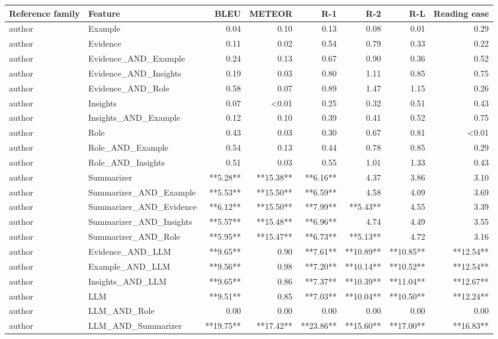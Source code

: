 \begin{tabular}{llrrrrrr}
\toprule
Reference family & Feature & BLEU & METEOR & R-1 & R-2 & R-L & Reading ease \\
\midrule
author & Example & 0.04 & 0.10 & 0.13 & 0.08 & 0.01 & 0.29 \\
author & Evidence & 0.11 & 0.02 & 0.54 & 0.79 & 0.33 & 0.22 \\
author & Evidence_AND_Example & 0.24 & 0.13 & 0.67 & 0.90 & 0.36 & 0.52 \\
author & Evidence_AND_Insights & 0.19 & 0.03 & 0.80 & 1.11 & 0.85 & 0.75 \\
author & Evidence_AND_Role & 0.58 & 0.07 & 0.89 & 1.47 & 1.15 & 0.26 \\
author & Insights & 0.07 & <0.01 & 0.25 & 0.32 & 0.51 & 0.43 \\
author & Insights_AND_Example & 0.12 & 0.10 & 0.39 & 0.41 & 0.52 & 0.75 \\
author & Role & 0.43 & 0.03 & 0.30 & 0.67 & 0.81 & <0.01 \\
author & Role_AND_Example & 0.54 & 0.13 & 0.44 & 0.78 & 0.85 & 0.29 \\
author & Role_AND_Insights & 0.51 & 0.03 & 0.55 & 1.01 & 1.33 & 0.43 \\
author & Summarizer & **5.28** & **15.38** & **6.16** & 4.37 & 3.86 & 3.10 \\
author & Summarizer_AND_Example & **5.53** & **15.50** & **6.59** & 4.58 & 4.09 & 3.69 \\
author & Summarizer_AND_Evidence & **6.12** & **15.50** & **7.99** & **5.43** & 4.55 & 3.39 \\
author & Summarizer_AND_Insights & **5.57** & **15.48** & **6.96** & 4.74 & 4.49 & 3.55 \\
author & Summarizer_AND_Role & **5.95** & **15.47** & **6.73** & **5.13** & 4.72 & 3.16 \\
author & Evidence_AND_LLM & **9.65** & 0.90 & **7.61** & **10.89** & **10.85** & **12.54** \\
author & Example_AND_LLM & **9.56** & 0.98 & **7.20** & **10.14** & **10.52** & **12.54** \\
author & Insights_AND_LLM & **9.65** & 0.86 & **7.37** & **10.39** & **11.04** & **12.67** \\
author & LLM & **9.51** & 0.85 & **7.03** & **10.04** & **10.50** & **12.24** \\
author & LLM_AND_Role & 0.00 & 0.00 & 0.00 & 0.00 & 0.00 & 0.00 \\
author & LLM_AND_Summarizer & **19.75** & **17.42** & **23.86** & **15.60** & **17.00** & **16.83** \\

\end{tabular}
